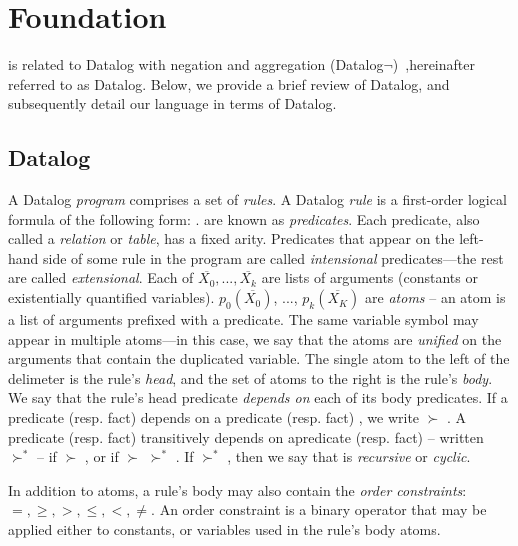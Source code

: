 \section{Foundation}
\label{sec:lang}

\lang is related to Datalog with negation and aggregation
(Datalog$\lnot$)~\cite{ullmanbook},hereinafter referred to as Datalog.
Below, we provide a brief review of Datalog, and subsequently detail our
language in terms of Datalog.

\subsection{Datalog}
\label{sec:datalog}

A Datalog {\em program} comprises a set of {\em rules}.  A Datalog {\em rule}
is a first-order logical formula of the following form:
.   are known as {\em
predicates}.  Each predicate, also called a {\em relation} or {\em table}, has
a fixed arity.  Predicates that appear on the left-hand side of some rule in
the program are called {\em intensional} predicates---the rest are called {\em
extensional}.  Each of $\overline{X_0}, ..., \overline{X_k}$ are lists of
arguments (constants or existentially quantified variables).
$p_0(\overline{X_0})$, ..., $p_k(\overline{X_K})$ are {\em atoms} -- an atom is
a list of arguments prefixed with a predicate.  The same variable symbol may
appear in multiple atoms---in this case, we say that the atoms are {\em
unified} on the arguments that contain the duplicated variable.  The single
atom to the left of the \dedalus{:-} delimeter is the rule's {\em head}, and
the set of atoms to the right is the rule's {\em body}.  We say that the rule's
head predicate {\em depends on} each of its body predicates.  If a predicate
(resp. fact)  depends on a predicate (resp. fact) , we
write  $\succ$ .  A predicate (resp. fact) 
transitively depends on apredicate (resp. fact)  -- written
 $\succ^*$  -- if  $\succ$ , or if
 $\succ$  $\succ^*$ .  If 
$\succ^*$ , then we say that  is {\em recursive} or {\em
cyclic}.

In addition to atoms, a rule's body may also contain the {\em order
constraints}: $=, \geq, >, \leq, <, \neq$.  An order constraint is a binary
operator that may be applied either to constants, or variables used in the
rule's body atoms.

